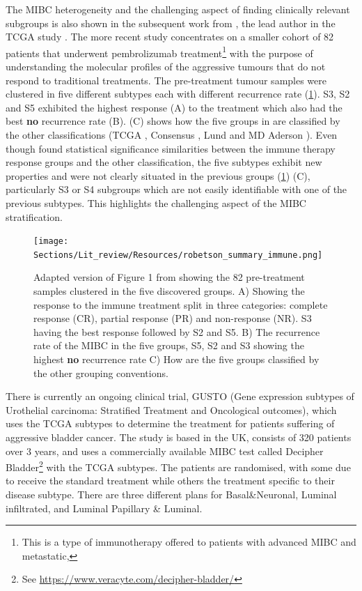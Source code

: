 The MIBC heterogeneity and the challenging aspect of finding clinically relevant subgroups is also shown in the subsequent work from \citet{Robertson2023-na}, the lead author in the TCGA study \cite{Robertson2017-mg}. The more recent study concentrates on a smaller cohort of 82 patients that underwent pembrolizumab treatment\footnote{This is a type of immunotherapy offered to patients with advanced MIBC and metastatic,} with the purpose of understanding the molecular profiles of the aggressive tumours that do not respond to traditional treatments. The pre-treatment tumour samples were clustered in five different subtypes each with different recurrence rate (\cref{fig:lit:immune_rob}). S3, S2 and S5 exhibited the highest response (A) to the treatment which also had the best \textbf{no} recurrence rate (B).  (C) shows how the five groups in \cite{Robertson2023-na} are classified by the other classifications (TCGA \cite{Robertson2017-mg}, Consensus \cite{Kamoun2020-tj}, Lund \cite{Marzouka2018-ge} and MD Aderson \cite{Dadhania2016-cb}). Even though \citet{Robertson2023-na} found statistical significance similarities between the immune therapy response groups and the other classification, the five subtypes exhibit new properties and were not clearly situated in the previous groups (\cref{fig:lit:immune_rob}) (C), particularly S3 or S4 subgroups which are not easily identifiable with one of the previous subtypes. This highlights the challenging aspect of the MIBC stratification.


\begin{figure}[!b]    
    \centering
\texttt{[image: Sections/Lit\_review/Resources/robetson\_summary\_immune.png]}
    \caption{Adapted version of Figure 1 from \cite{Robertson2023-na} showing the 82 pre-treatment samples clustered in the five discovered groups. A) Showing the response to the immune treatment split in three categories: complete response (CR), partial response (PR) and non-response (NR). S3 having the best response followed by S2 and S5. B) The recurrence rate of the MIBC in the five groups, S5, S2 and S3 showing the highest \textbf{no} recurrence rate C) How are the five groups classified by the other grouping conventions.}
    \label{fig:lit:immune_rob}
\end{figure}


There is currently an ongoing clinical trial, GUSTO (Gene expression subtypes of Urothelial carcinoma: Stratified Treatment and Oncological outcomes), which uses the TCGA subtypes to determine the treatment for patients suffering of aggressive bladder cancer. The study is based in the UK, consists of 320 patients over 3 years, and uses a commercially available MIBC test called Decipher Bladder\footnote{See \url{https://www.veracyte.com/decipher-bladder/}} with the TCGA subtypes\cite{Griffin2024-zr}. The patients are randomised, with some  due to receive the standard treatment while others the treatment specific to their disease subtype. There are three different plans for Basal\&Neuronal, Luminal infiltrated, and Luminal Papillary \& Luminal.

